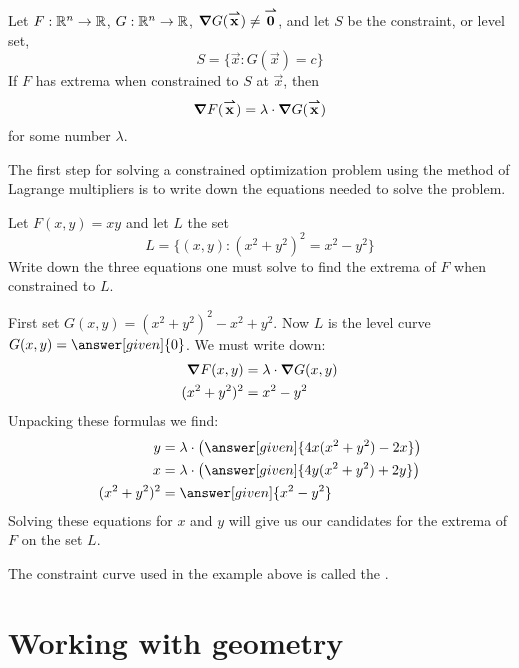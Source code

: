 \documentclass{ximera}
\begin{document}
\begin{theorem}
  Let $F:\mathbb R^n\to\mathbb R$, $G:\mathbb R^n\to\mathbb R$, $\boldsymbol\nabla G({\overset{\boldsymbol{\rightharpoonup}}{\mathbf{x}}}\hspace{0in}) \ne {\overset{\boldsymbol{\rightharpoonup}}{\mathbf{0}}}\hspace{0in}$,
  and let $S$ be the constraint, or level set,
  \[
  S = \{\vec{x}: G(\vec{x}) = c\}
  \]
  If $F$ has extrema when constrained to $S$ at $\vec{x}$, then
  \[
  \boldsymbol\nabla F({\overset{\boldsymbol{\rightharpoonup}}{\mathbf{x}}}\hspace{0in}) = \lambda \cdot \boldsymbol\nabla G({\overset{\boldsymbol{\rightharpoonup}}{\mathbf{x}}}\hspace{0in})
  \]
  for some number $\lambda$.
\end{theorem}

The first step for solving a constrained optimization problem using
the method of Lagrange multipliers is to write down the equations
needed to solve the problem.

\begin{example}
  Let $F(x,y) = xy$ and let $L$ the set
  \[
  L = \{(x,y):(x^2+y^2)^2 = x^2-y^2\}
  \]
  Write down the three equations one must solve to find the extrema of
  $F$ when constrained to $L$.
  \begin{explanation}
    First set $G(x,y)= (x^2+y^2)^2 - x^2 +y^2$. Now $L$ is the level
    curve $G(x,y) =\answer[given]{0}$.  We must write down:
    \begin{align*}
      \boldsymbol\nabla F(x,y) &= \lambda \cdot \boldsymbol\nabla G(x,y)\\
      (x^2+y^2)^2 &= x^2-y^2
    \end{align*}
    Unpacking these formulas we find:
    \begin{align*}
      y &= \lambda \cdot \left(\answer[given]{4x(x^2+y^2)-2x}\right)\\
      x &= \lambda \cdot \left(\answer[given]{4y(x^2+y^2)+2y}\right)\\
      (x^2+y^2)^2 &= \answer[given]{x^2-y^2}
    \end{align*}
    Solving these equations for $x$ and $y$ will give us our
    candidates for the extrema of $F$ on the set $L$.
  \end{explanation}
\end{example}

\begin{remark}
  The constraint curve used in the example above is called the .
\end{remark}




\section{Working with geometry}
\end{document}
